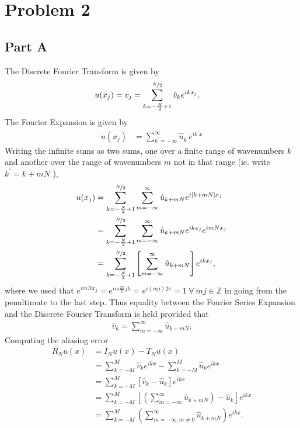 \documentclass[12pt]{article}
\newcommand{\vhat}{\hat{v}}
\begin{document}
\section*{Problem 2}

\subsection*{Part A}

The Discrete Fourier Transform is given by
\begin{align}
    u(x_{j}) = v_{j} &= \sum_{k=-\frac{N}{2}+1}^{\nicefrac{N}{2}} \vhat_{k}e^{ikx_{j}}.
\end{align}
The Fourier Expansion is given by
\begin{align}
    u(x_{j}) &= \sum_{k^{\prime}=-\infty}^{\infty} \hat{u}_{k^{\prime}}e^{ik^{\prime}x}
\end{align}
Writing the infinite sums as two sums, one over a finite range of wavenumbers $k$ and another over the range of wavenumbers $m$ not in that range (ie. write $k^{\prime} = k + mN$ ),
\begin{subequations}
    \begin{align}
        u(x_{j}) &= \sum_{k=-\frac{N}{2}+1}^{\nicefrac{N}{2}}\sum_{m=-\infty}^{\infty} \hat{u}_{k+mN}e^{i\left[k+mN\right]x_{j}}\\
        &= \sum_{k=-\frac{N}{2}+1}^{\nicefrac{N}{2}}\sum_{m=-\infty}^{\infty} \hat{u}_{k+mN}e^{ikx_{j}}e^{imNx_{j}}\\
        &= \sum_{k=-\frac{N}{2}+1}^{\nicefrac{N}{2}}\left[\sum_{m=-\infty}^{\infty} \hat{u}_{k+mN}\right]e^{ikx_{j}},
    \end{align}
\end{subequations} 
where we used that $e^{imNx_{j}} = e^{im\frac{2\pi}{h}jh} = e^{i(mj)2\pi} = 1\ \forall\ mj\in\mathbb{Z}$ in going from the penultimate to the last step. 
Thus equality between the Fourier Series Expansion and the Discrete Fourier Transform is held provided that 
\begin{align}
    \vhat_{k} = \sum_{m=-\infty}^{\infty} \hat{u}_{k+mN}.
\end{align}
Computing the aliasing error 
\begin{subequations}
    \begin{align}
        R_{N}u(x) &= I_{N}u(x) - T_{N}u(x)\\
        &= \sum_{k=-M}^{M}\vhat_{k}e^{ikx} - \sum_{k=-M}^{M}\hat{u}_{k}e^{ikx}\\
        &= \sum_{k=-M}^{M} \left[\vhat_{k}-\hat{u}_{k}\right]e^{ikx}\\
        &= \sum_{k=-M}^{M} \left[\left(\sum_{m=-\infty}^{\infty} \hat{u}_{k+mN}\right)-\hat{u}_{k}\right]e^{ikx}\\
        &= \sum_{k=-M}^{M} \left(\sum_{m=-\infty,m\neq 0}^{\infty} \hat{u}_{k+mN}\right)e^{ikx}.
    \end{align}
\end{subequations}
\end{document}
